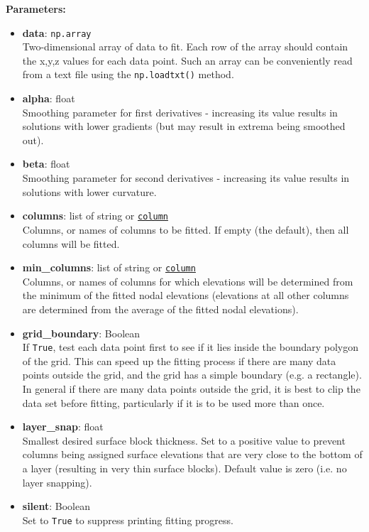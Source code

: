 \textbf{Parameters:}
\begin{itemize}
\item \textbf{data}: \texttt{np.array}\\
  Two-dimensional array of data to fit.  Each row of the array should contain the x,y,z values for each data point.  Such an array can be conveniently read from a text file using the \texttt{np.loadtxt()} method.
\item \textbf{alpha}: float\\
  Smoothing parameter for first derivatives - increasing its value results in solutions with lower gradients (but may result in extrema being smoothed out).
\item \textbf{beta}: float\\
  Smoothing parameter for second derivatives - increasing its value results in solutions with lower curvature.
\item \textbf{columns}: list of string or \hyperref[columnobjects]{\texttt{column}}\\
  Columns, or names of columns to be fitted.  If empty (the default), then all columns will be fitted.
\item \textbf{min\_columns}: list of string or \hyperref[columnobjects]{\texttt{column}}\\
  Columns, or names of columns for which elevations will be determined from the minimum of the fitted nodal elevations (elevations at all other columns are determined from the average of the fitted nodal elevations).
\item \textbf{grid\_boundary}: Boolean\\
  If \texttt{True}, test each data point first to see if it lies inside the boundary polygon of the grid.  This can speed up the fitting process if there are many data points outside the grid, and the grid has a simple boundary (e.g. a rectangle).  In general if there are many data points outside the grid, it is best to clip the data set before fitting, particularly if it is to be used more than once.
\item \textbf{layer\_snap}: float\\
  Smallest desired surface block thickness.  Set to a positive value to prevent columns being assigned surface elevations that are very close to the bottom of a layer (resulting in very thin surface blocks).  Default value is zero (i.e. no layer snapping).
\item \textbf{silent}: Boolean\\
  Set to \texttt{True} to suppress printing fitting progress.
\end{itemize}

